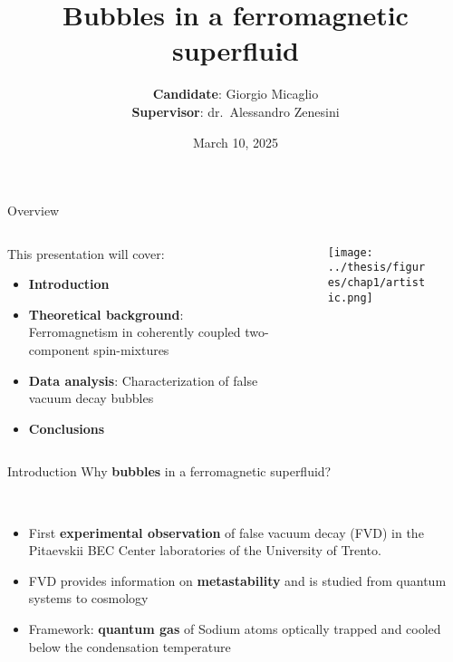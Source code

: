 \documentclass[aspectratio=169]{beamer}
\title[Bubbles in a ferromagnetic superfluid] %
{Bubbles in a ferromagnetic superfluid} %
\author{\textbf{Candidate}: Giorgio Micaglio\\\textbf{Supervisor}: dr.\ Alessandro Zenesini}
\institute{Bachelor's Degree in Physics}
\date[March 10, 2025]  %
{March 10, 2025} %
\begin{document}
\begin{frame}[plain]
  \titlepage
\end{frame}

\begin{frame}{Overview}
  \begin{columns}
      \begin{column}{0.7\textwidth}
          This presentation will cover:
          \begin{itemize}
              \item \textbf{Introduction}
              \item \textbf{Theoretical background}: Ferromagnetism in coherently coupled two-component spin-mixtures
              \item \textbf{Data analysis}: Characterization of false vacuum decay bubbles
              \item \textbf{Conclusions}
          \end{itemize}
      \end{column}
      \begin{column}{0.3\textwidth}
          \begin{figure}
              \centering
              \texttt{[image: ../thesis/figures/chap1/artistic.png]}
          \end{figure}
      \end{column}
  \end{columns}
\end{frame}

\begin{frame}{Introduction}
  Why \textbf{bubbles} in a ferromagnetic superfluid?

  ~

  \begin{itemize}
      \item First \textbf{experimental observation} of false vacuum decay (FVD) in the Pitaevskii BEC Center laboratories of the University of Trento.
      \item FVD provides information on \textbf{metastability} and is studied from quantum systems to cosmology
      \item Framework: \textbf{quantum gas} of Sodium atoms optically trapped and cooled below the condensation temperature
  \end{itemize}
  
\end{frame}

\end{document}
